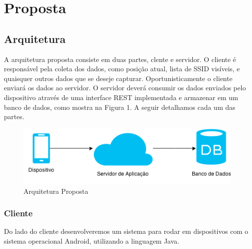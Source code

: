 \documentclass[12pt, %
openright, 
oneside,
a4paper,
brazil]{facom-ufu-abntex2}
\begin{document}

\chapter{Proposta}

\section{Arquitetura}
A arquitetura proposta consiste em duas partes, clente e servidor. O cliente é responsável pela coleta dos dados, como posição atual, lista de SSID visíveis, e quaisquer outros dados que se deseje capturar. Oportunisticamente o cliente enviará os dados ao servidor. O servidor deverá consumir os dados enviados pelo dispositivo através de uma interface REST implementada e armazenar em um banco de dados, como mostra na Figura 1.  A seguir detalhamos cada um das partes.

\begin{figure}[hbt]
  \includegraphics{arquiteturaProposta}
  \caption{Arquitetura Proposta}
\end{figure}


\subsection{Cliente}
Do lado do cliente desenvolveremos um sistema para rodar em dispositivos com o sistema operacional Android, utilizando a linguagem Java.
\end{document}
